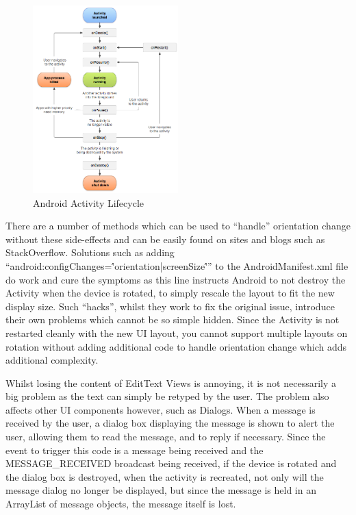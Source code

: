 \FloatBarrier

\begin{figure}[!htpb]
	\centering
	\includegraphics[width=0.5\textwidth]{"screenshots/android_lifecycle"}
	\caption{Android Activity Lifecycle\cite{androidLifecycle}}
	\label{fig:android_lifecycle}
\end{figure}

\FloatBarrier

There are a number of methods which can be used to ``handle'' orientation change without these side-effects and can be easily found on sites and blogs such as StackOverflow\cite{norotation}.  Solutions such as adding ``android:configChanges=\''orientation|screenSize\'''' to the AndroidManifest.xml file do work and cure the symptoms as this line instructs Android to not destroy the Activity when the device is rotated, to simply rescale the layout to fit the new display size.  Such ``hacks'', whilst they work to fix the original issue, introduce their own problems which cannot be so simple hidden.  Since the Activity is not restarted cleanly with the new UI layout, you cannot support multiple layouts on rotation without adding additional code to handle orientation change which adds additional complexity.

Whilst losing the content of EditText Views is annoying, it is not necessarily a big problem as the text can simply be retyped by the user.  The problem also affects other UI components however, such as Dialogs\cite{androidDialogs}.  When a message is received by the user, a dialog box displaying the message is shown to alert the user, allowing them to read the message, and to reply if necessary.  Since the event to trigger this code is a message being received and the MESSAGE\_RECEIVED broadcast being received, if the device is rotated and the dialog box is destroyed, when the activity is recreated, not only will the message dialog no longer be displayed, but since the message is held in an ArrayList of message objects, the message itself is lost.

